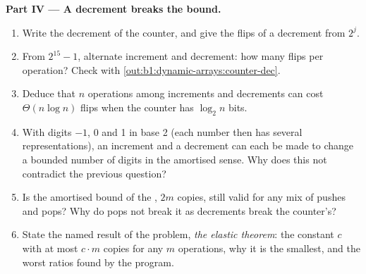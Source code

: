 \begin{problem}
\medskip\noindent\textbf{Part IV --- A decrement breaks the bound.}
\begin{enumerate}[resume]
\item Write the decrement of the counter, and give the flips of a decrement from $2^j$.
\item From $2^{15} - 1$, alternate increment and decrement: how many flips per operation? Check with
\cref{out:b1:dynamic-arrays:counter-dec}.
\item Deduce that $n$ operations among increments and decrements can cost $\Theta(n \log n)$ flips when the counter has
$\log_2 n$ bits.
\item With digits $-1$, 0 and 1 in base 2 (each number then has several representations), an increment and a decrement
can each be made to change a bounded number of digits in the amortised sense. Why does this not contradict the previous
question?
\item Is the amortised bound of the , $2m$ copies, still valid for any mix of pushes and pops? Why do pops not break
it as decrements break the counter's?
\item State the named result of the problem, \emph{the elastic  theorem}: the constant $c$ with at most $c \cdot m$
copies for any $m$ operations, why it is the smallest, and the worst ratios found by the program.
\end{enumerate}
\end{problem}

